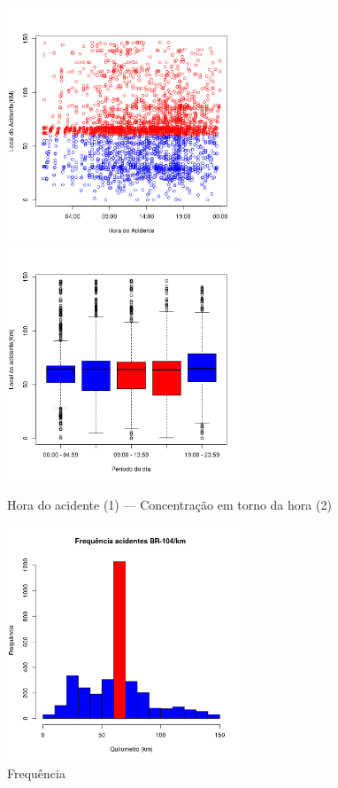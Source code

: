 \begin{figure}[h]
	\caption{Hora do acidente (1) --- Concentração em torno da hora (2) }
	\includegraphics[width=7cm,height=7cm]{Figuras/Preprocess/br104_1.png}
	\includegraphics[width=7cm,height=7cm]{Figuras/Preprocess/br104_2.png}

\end{figure}

\quad \quad
\begin{figure}[h]
	\centering
	\caption{ Frequência}
	\includegraphics[width=7cm,height=7cm]{Figuras/Preprocess/br104_3.png}
\end{figure}

